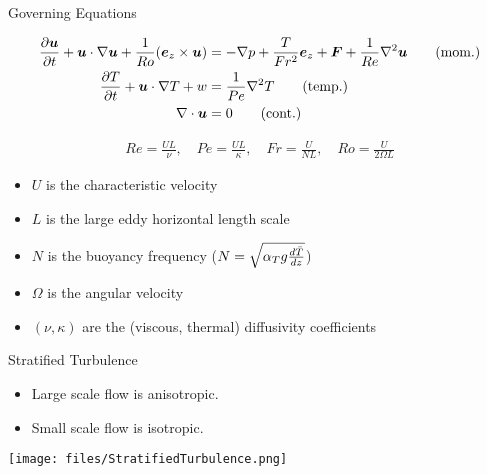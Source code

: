 \documentclass{beamer}
\begin{document}
\begin{frame}{Governing Equations}

    {\small
    \begin{align}
        \frac{\partial \boldsymbol{u}}{\partial t} + \boldsymbol{u} \cdot \nabla \boldsymbol{u} +
        \frac{1}{Ro}(\boldsymbol{e}_z \times
        \boldsymbol{u}) &= -\nabla p +
        \frac{T}{Fr^2}\boldsymbol{e}_z + \boldsymbol{F} + \frac{1}{Re}\nabla^2\boldsymbol{u} \tag{mom.}\label{eq:momentum}\\
        \frac{\partial T}{\partial t} + \boldsymbol{u} \cdot \nabla T + w &= \frac{1}{Pe}\nabla^2T \tag{temp.} \label{eq:temp} \\
        \nabla \cdot \boldsymbol{u} &= 0 \tag{cont.}\label{eq:cont}
    \end{align}
    
    \begin{align*}
        Re = \frac{UL}{\nu}, \quad Pe = \frac{UL}{\kappa}, \quad Fr =
        \frac{U}{NL}, \quad Ro = \frac{U}{2\Omega L}
    \end{align*}
    }
    \begin{itemize}
        \item $U$ is the characteristic velocity
        \item $L$ is the large eddy horizontal length scale
        \item $N$ is the buoyancy frequency ($N = \sqrt{\alpha_Tg\frac{d \bar{T}}{d z}}$)
        \item $\Omega$ is the angular velocity
        \item $(\nu, \kappa)$ are the (viscous, thermal) diffusivity coefficients
    \end{itemize}

\end{frame}

\begin{frame}{Stratified Turbulence}

    \begin{itemize}
        \item Large scale flow is anisotropic.
        \item Small scale flow is isotropic.
    \end{itemize}

\begin{center}
    \texttt{[image: files/StratifiedTurbulence.png]}
\end{center}
\end{frame}
\end{document}
